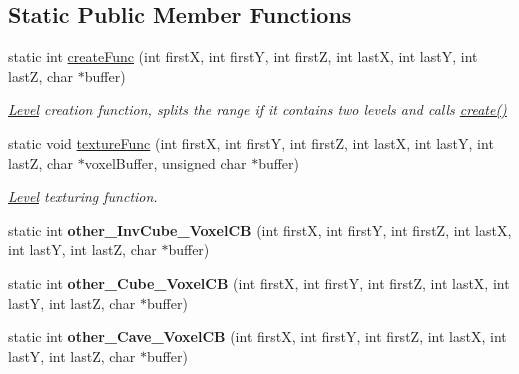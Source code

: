 \subsection*{\-Static \-Public \-Member \-Functions}
\begin{DoxyCompactItemize}
\item 
\hypertarget{classLevel_a89514a6df260914d339030da4b62b583}{
static int \hyperlink{classLevel_a89514a6df260914d339030da4b62b583}{create\-Func} (int first\-X, int first\-Y, int first\-Z, int last\-X, int last\-Y, int last\-Z, char $\ast$buffer)}
\label{d2/d9d/classLevel_a89514a6df260914d339030da4b62b583}

\begin{DoxyCompactList}\small\item\em \hyperlink{classLevel}{\-Level} creation function, splits the range if it contains two levels and calls \hyperlink{classLevel_a6bd5b177bd5fab4f972f1959ff216ce9}{create()} \end{DoxyCompactList}\item 
\hypertarget{classLevel_a1441eecefb5f758c0770768cd831c3ee}{
static void \hyperlink{classLevel_a1441eecefb5f758c0770768cd831c3ee}{texture\-Func} (int first\-X, int first\-Y, int first\-Z, int last\-X, int last\-Y, int last\-Z, char $\ast$voxel\-Buffer, unsigned char $\ast$buffer)}
\label{d2/d9d/classLevel_a1441eecefb5f758c0770768cd831c3ee}

\begin{DoxyCompactList}\small\item\em \hyperlink{classLevel}{\-Level} texturing function. \end{DoxyCompactList}\item 
\hypertarget{classLevel_a102cb88c96cdc510eed205127c4b8f7e}{
static int {\bfseries other\-\_\-\-Inv\-Cube\-\_\-\-Voxel\-C\-B} (int first\-X, int first\-Y, int first\-Z, int last\-X, int last\-Y, int last\-Z, char $\ast$buffer)}
\label{d2/d9d/classLevel_a102cb88c96cdc510eed205127c4b8f7e}

\item 
\hypertarget{classLevel_a9c2bb3ec4d076c53f064263f6a4ca54a}{
static int {\bfseries other\-\_\-\-Cube\-\_\-\-Voxel\-C\-B} (int first\-X, int first\-Y, int first\-Z, int last\-X, int last\-Y, int last\-Z, char $\ast$buffer)}
\label{d2/d9d/classLevel_a9c2bb3ec4d076c53f064263f6a4ca54a}

\item 
\hypertarget{classLevel_a4f8c483f7817d049d6fef2544efd6b14}{
static int {\bfseries other\-\_\-\-Cave\-\_\-\-Voxel\-C\-B} (int first\-X, int first\-Y, int first\-Z, int last\-X, int last\-Y, int last\-Z, char $\ast$buffer)}
\label{d2/d9d/classLevel_a4f8c483f7817d049d6fef2544efd6b14}


\end{DoxyCompactItemize}
